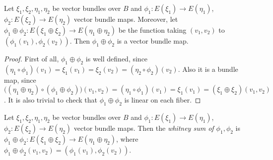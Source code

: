 \begin{proposition} Let $\xi_1,\xi_2,\eta_1,\eta_2$ be vector bundles over $B$ and $\phi_1:E(\xi_1)\to E(\eta_1)$, $\phi_2:E(\xi_2)\to E(\eta_2)$ vector bundle maps. Moreover, let $\phi_1\oplus\phi_2:E(\xi_1\oplus\xi_2)\to E(\eta_1\oplus\eta_2)$ be the function taking $(v_1,v_2)$ to $(\phi_1(v_1),\phi_2(v_2))$. Then $\phi_1\oplus\phi_2$ is a vector bundle map.
\end{proposition}
\begin{proof} First of all, $\phi_1\oplus\phi_2$ is well defined, since $(\eta_1\circ\phi_1)(v_1)=\xi_1(v_1)=\xi_2(v_2)=(\eta_2\circ\phi_2)(v_2)$. Also it is a bundle map, since $\big((\eta_1\oplus\eta_2)\circ(\phi_1\oplus\phi_2)\big)(v_1,v_2)=(\eta_1\circ\phi_1)(v_1)=\xi_1(v_1)=(\xi_1\oplus\xi_2)(v_1,v_2)$. It is also trivial to check that $\phi_1\oplus\phi_2$ is linear on each fiber.
\end{proof}
\begin{definition}\label{def:wh_sum_map} Let $\xi_1,\xi_2,\eta_1,\eta_2$ be vector bundles over $B$ and $\phi_1:E(\xi_1)\to E(\eta_1)$, $\phi_2:E(\xi_2)\to E(\eta_2)$ vector bundle maps. Then the \emph{whitney sum of $\phi_1,\phi_2$} is $\phi_1\oplus\phi_2:E(\xi_1\oplus\xi_2)\to E(\eta_1\oplus\eta_2)$, where $\phi_1\oplus\phi_2(v_1,v_2)=(\phi_1(v_1),\phi_2(v_2))$.
\end{definition}

